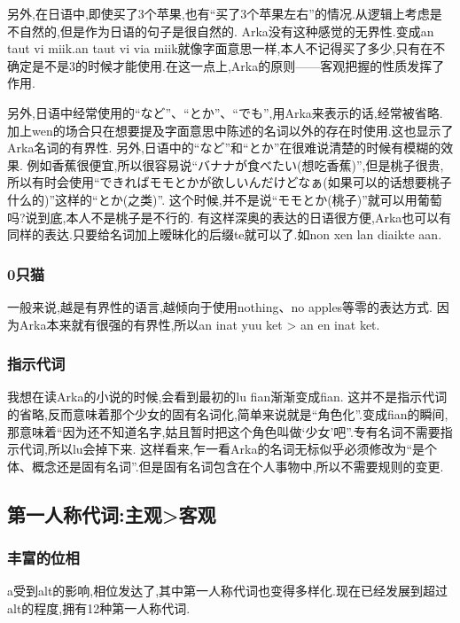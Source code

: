 另外,在日语中,即使买了3个苹果,也有“买了3个苹果左右”的情况.从逻辑上考虑是不自然的,但是作为日语的句子是很自然的.
Arka没有这种感觉的无界性.变成an taut vi miik.an taut vi via miik就像字面意思一样,本人不记得买了多少,只有在不确定是不是3的时候才能使用.在这一点上,Arka的原则——客观把握的性质发挥了作用.

另外,日语中经常使用的“など”、“とか”、“でも”,用Arka来表示的话,经常被省略.加上wen的场合只在想要提及字面意思中陈述的名词以外的存在时使用.这也显示了Arka名词的有界性.
另外,日语中的“など”和“とか”在很难说清楚的时候有模糊的效果.
例如香蕉很便宜,所以很容易说“バナナが食べたい(想吃香蕉)”,但是桃子很贵,所以有时会使用“できればモモとかが欲しいんだけどなぁ(如果可以的话想要桃子什么的)”这样的“とか(之类)”.
这个时候,并不是说“モモとか(桃子)”就可以用葡萄吗?说到底,本人不是桃子是不行的.
有这样深奥的表达的日语很方便,Arka也可以有同样的表达.只要给名词加上暧昧化的后缀te就可以了.如non xen lan diaikte aan.

\subsubsection{0只猫}

一般来说,越是有界性的语言,越倾向于使用nothing、no apples等零的表达方式.
因为Arka本来就有很强的有界性,所以an inat yuu ket > an en inat ket.

\subsubsection{指示代词}

我想在读Arka的小说的时候,会看到最初的lu fian渐渐变成fian.
这并不是指示代词的省略,反而意味着那个少女的固有名词化,简单来说就是“角色化”.变成fian的瞬间,那意味着“因为还不知道名字,姑且暂时把这个角色叫做‘少女’吧”.专有名词不需要指示代词,所以lu会掉下来.
这样看来,乍一看Arka的名词无标似乎必须修改为“是个体、概念还是固有名词”.但是固有名词包含在个人事物中,所以不需要规则的变更.

\subsection{第一人称代词:主观>客观}

\subsubsection{丰富的位相}

a受到alt的影响,相位发达了,其中第一人称代词也变得多样化.现在已经发展到超过alt的程度,拥有12种第一人称代词.


